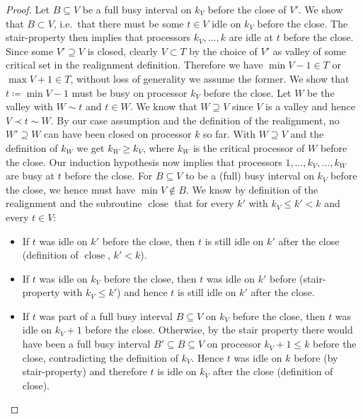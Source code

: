 \documentclass[a4paper]{article}
\DeclareMathOperator{\close}{close}
\begin{document}
\begin{proof}
      Let $B \subseteq V$ be a full busy interval on $k_V$ before the close of $V'$.
      We show that $B \subset V$, i.e.\ that there must be some $t \in V$ idle on $k_V$ before the close.
      The stair-property then implies that processors $k_V, \ldots, k$ are idle at $t$ before the close.
      Since some $V' \supseteq V$ is closed, clearly $V \subset T$ by the choice of $V'$ as valley of some critical set in the realignment definition.
      Therefore we have $\min V - 1 \in T$ or $\max V + 1 \in T$, without loss of generality we assume the former.
      We show that $t \coloneqq \min V - 1$ must be busy on processor $k_V$ before the close.
      Let $W$ be the valley with $W \sim t$ and $t \in W$.
      We know that $W \supseteq V$ since $V$ is a valley and hence $V \prec t \sim W$.
      By our case assumption and the definition of the realignment, no $W' \supseteq W$ can have been closed on processor $k$ so far.
      With $W \supseteq V$ and the definition of $k_W$ we get $k_W \geq k_V$, where $k_W$ is the critical processor of $W$ before the close.
      Our induction hypothesis now implies that processors $1, \ldots, k_V, \ldots, k_W$ are busy at $t$ before the close.
      For $B \subseteq V$ to be a (full) busy interval on $k_V$ before the close, we hence must have $\min V \notin B$.
      We know by definition of the realignment and the subroutine $\close$ that for every $k'$ with $k_V \leq k' < k$ and every $t \in V$:
      \begin{itemize}
        \item
          If $t$ was idle on $k'$ before the close, then $t$ is still idle on $k'$ after the close (definition of $\close$, $k' < k$).
        \item
          If $t$ was idle on $k_V$ before the close, then $t$ was idle on $k'$ before (stair-property with $k_V \leq k'$) and hence $t$ is still idle on $k'$ after the close.
        \item
          If $t$ was part of a full busy interval $B \subseteq V$ on $k_V$ before the close, then $t$ was idle on $k_V + 1$ before the close.
          Otherwise, by the stair property there would have been a full busy interval $B' \subseteq B \subseteq V$ on processor $k_V + 1 \leq k$ before the close, contradicting the definition of $k_V$.
          Hence $t$ was idle on $k$ before (by stair-property) and therefore $t$ is idle on $k_V$ after the close (definition of close).
      \end{itemize}

\end{proof}
\end{document}

